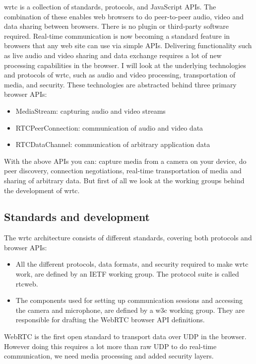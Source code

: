
\gls{wrtc} is a collection of standards, protocols, and JavaScript APIs. The combination of these enables web browsers to do peer-to-peer audio, video and data sharing between browsers. There is no plugin or third-party software required. Real-time communication is now becoming a standard feature in browsers that any web site can use via simple APIs. Delivering functionality such as live audio and video sharing and data exchange requires a lot of new processing capabilities in the browser. I will look at the underlying technologies and protocols of \gls{wrtc}, such as audio and video processing, transportation of media, and security. These technologies are abstracted behind three primary browser APIs:

\begin{itemize}
\item MediaStream: capturing audio and video streams
\item RTCPeerConnection: communication of audio and video data
\item RTCDataChannel: communication of arbitrary application data
\end{itemize}

With the above APIs you can: capture media from a camera on your device, do peer discovery, connection negotiations, real-time transportation of media and sharing of arbitrary data. But first of all we look at the working groups behind the development of \gls{wrtc}.

\subsection{Standards and development}
The \gls{wrtc} architecture consists of different standards, covering both protocols and browser APIs:

\begin{itemize}
\item All the different protocols, data formats, and security required to make \gls{wrtc} work, are defined by an IETF working group. The protocol suite is called \gls{rtcweb}.
\item The components used for setting up communication sessions and accessing the camera and microphone, are defined by a \gls{w3c} working group. They are responsible for drafting the WebRTC browser API definitions.
\end{itemize}

WebRTC is the first open standard to transport data over UDP in the browser. However doing this requires a lot more than raw UDP to do real-time communication, we need media processing and added security layers.

